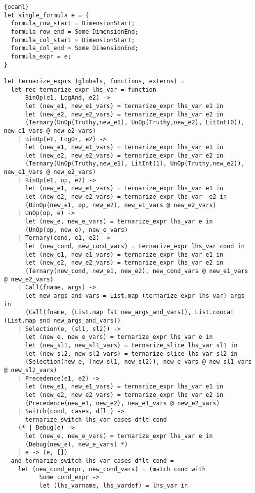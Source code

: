 \begin{lstlisting}{ocaml}
let single_formula e = {
  formula_row_start = DimensionStart;
  formula_row_end = Some DimensionEnd;
  formula_col_start = DimensionStart;
  formula_col_end = Some DimensionEnd;
  formula_expr = e;
}

let ternarize_exprs (globals, functions, externs) =
  let rec ternarize_expr lhs_var = function
      BinOp(e1, LogAnd, e2) ->
      let (new_e1, new_e1_vars) = ternarize_expr lhs_var e1 in
      let (new_e2, new_e2_vars) = ternarize_expr lhs_var e2 in
      (Ternary(UnOp(Truthy,new_e1), UnOp(Truthy,new_e2), LitInt(0)), new_e1_vars @ new_e2_vars)
    | BinOp(e1, LogOr, e2) ->
      let (new_e1, new_e1_vars) = ternarize_expr lhs_var e1 in
      let (new_e2, new_e2_vars) = ternarize_expr lhs_var e2 in
      (Ternary(UnOp(Truthy,new_e1), LitInt(1), UnOp(Truthy,new_e2)), new_e1_vars @ new_e2_vars)
    | BinOp(e1, op, e2) ->
      let (new_e1, new_e1_vars) = ternarize_expr lhs_var e1 in
      let (new_e2, new_e2_vars) = ternarize_expr lhs_var  e2 in
      (BinOp(new_e1, op, new_e2), new_e1_vars @ new_e2_vars)
    | UnOp(op, e) ->
      let (new_e, new_e_vars) = ternarize_expr lhs_var e in
      (UnOp(op, new_e), new_e_vars)
    | Ternary(cond, e1, e2) ->
      let (new_cond, new_cond_vars) = ternarize_expr lhs_var cond in
      let (new_e1, new_e1_vars) = ternarize_expr lhs_var e1 in
      let (new_e2, new_e2_vars) = ternarize_expr lhs_var e2 in
      (Ternary(new_cond, new_e1, new_e2), new_cond_vars @ new_e1_vars @ new_e2_vars)
    | Call(fname, args) ->
      let new_args_and_vars = List.map (ternarize_expr lhs_var) args in
      (Call(fname, (List.map fst new_args_and_vars)), List.concat (List.map snd new_args_and_vars))
    | Selection(e, (sl1, sl2)) ->
      let (new_e, new_e_vars) = ternarize_expr lhs_var e in
      let (new_sl1, new_sl1_vars) = ternarize_slice lhs_var sl1 in
      let (new_sl2, new_sl2_vars) = ternarize_slice lhs_var sl2 in
      (Selection(new_e, (new_sl1, new_sl2)), new_e_vars @ new_sl1_vars @ new_sl2_vars)
    | Precedence(e1, e2) ->
      let (new_e1, new_e1_vars) = ternarize_expr lhs_var e1 in
      let (new_e2, new_e2_vars) = ternarize_expr lhs_var e2 in
      (Precedence(new_e1, new_e2), new_e1_vars @ new_e2_vars)
    | Switch(cond, cases, dflt) ->
      ternarize_switch lhs_var cases dflt cond
    (* | Debug(e) ->
      let (new_e, new_e_vars) = ternarize_expr lhs_var e in
      (Debug(new_e), new_e_vars) *)
    | e -> (e, [])
  and ternarize_switch lhs_var cases dflt cond =
    let (new_cond_expr, new_cond_vars) = (match cond with
          Some cond_expr ->
          let (lhs_varname, lhs_vardef) = lhs_var in

\end{lstlisting}
